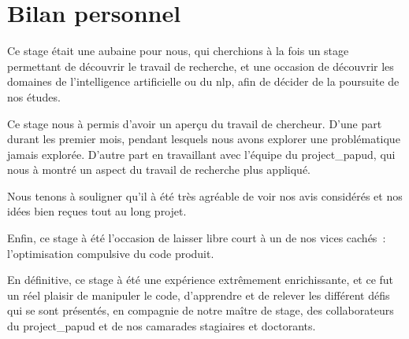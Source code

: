 \section{Bilan personnel}
Ce stage était une aubaine pour nous, qui cherchions à la fois un stage permettant de découvrir le travail de recherche, et une occasion de découvrir les domaines de l'intelligence artificielle ou du \gls{nlp}, afin de décider de la poursuite de nos études.

Ce stage nous à permis d'avoir un aperçu du travail de chercheur. D'une part durant les premier mois, pendant lesquels nous avons explorer une problématique jamais explorée. D'autre part en travaillant avec l'équipe du \gls{project_papud}, qui nous à montré un aspect du travail de recherche plus appliqué.

Nous tenons à souligner qu'il à été très agréable de voir nos avis considérés et nos idées bien reçues tout au long projet.

Enfin, ce stage à été l'occasion de laisser libre court à un de nos vices cachés~: l'optimisation compulsive du code produit.

En définitive, ce stage à été une expérience extrêmement enrichissante, et ce fut un réel plaisir de manipuler le code, d'apprendre et de relever les différent défis qui se sont présentés, en compagnie de notre maître de stage, des collaborateurs du \gls{project_papud} et de nos camarades stagiaires et doctorants.









